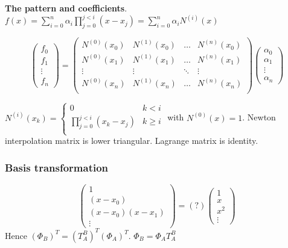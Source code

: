 \documentclass[11pt]{article}
\begin{document}
\textbf{The pattern and coefficients}.
\(f(x)=\displaystyle\sum_{i=0}^n\alpha_i
    \displaystyle\prod_{j=0}^{j<i}(x-x_j)
    =\displaystyle\sum_{i=0}^n\alpha_iN^{(i)}(x)\)

\begin{equation*}
\begin{pmatrix}
f_0\\
f_1\\
\vdots\\
f_n
\end{pmatrix}=
\begin{pmatrix}
N^{(0)}(x_0) & N^{(1)}(x_0) & \dots & N^{(n)}(x_0)\\
N^{(0)}(x_1) & N^{(1)}(x_1) & \dots & N^{(n)}(x_1)\\
\vdots & \vdots & \ddots&\vdots\\
N^{(0)}(x_n) & N^{(1)}(x_n) & \dots & N^{(n)}(x_n)\\
\end{pmatrix}
\begin{pmatrix}
\alpha_0\\
\alpha_1\\
\vdots\\
\alpha_n
\end{pmatrix}
\end{equation*}

\(N^{(i)}(x_k)=\begin{cases}
    0&k<i\\
    \prod_{j=0}^{j<i}(x_k-x_j)&k\ge i\\
    \end{cases}\) with \(N^{(0)}(x) = 1\).
Newton interpolation matrix is lower triangular.
Lagrange matrix is identity.
\subsubsection{Basis transformation}
\label{sec:org6104700}
\begin{equation*}
\begin{pmatrix}
1\\
(x-x_0)\\
(x-x_0)(x-x_1)\\
\vdots
\end{pmatrix}=(?)
\begin{pmatrix}
1\\
x\\
x^2\\
\vdots
\end{pmatrix}
\end{equation*}
Hence \((\Phi_B)^T=(T_A^B)^T(\Phi_A)^T\).
\(\Phi_B=\Phi_AT_A^B\)
\end{document}
